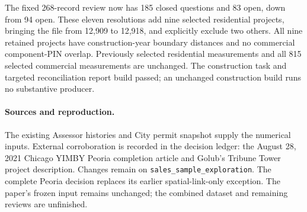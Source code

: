 The fixed 268-record review now has 185 closed questions and 83 open, down from 94 open. These eleven resolutions add nine selected residential projects, bringing the file from 12,909 to 12,918, and explicitly exclude two others. All nine retained projects have construction-year boundary distances and no commercial component-PIN overlap. Previously selected residential measurements and all 815 selected commercial measurements are unchanged. The construction task and targeted reconciliation report build passed; an unchanged construction build runs no substantive producer.

\paragraph{Sources and reproduction.} The existing Assessor histories and City permit snapshot supply the numerical inputs. External corroboration is recorded in the decision ledger: the August 28, 2021 Chicago YIMBY Peoria completion article and Golub's Tribune Tower project description. Changes remain on \texttt{sales\_sample\_exploration}. The complete Peoria decision replaces its earlier spatial-link-only exception. The paper's frozen input remains unchanged; the combined dataset and remaining reviews are unfinished.
